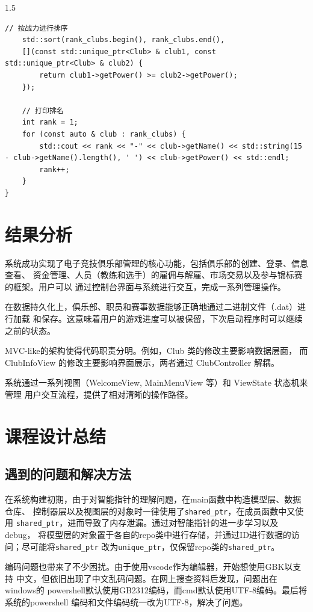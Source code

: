 \documentclass[a4paper]{article}
\begin{document}
\begin{spacing}{1.5}
\begin{lstlisting}[caption=排名]
    // 按战力进行排序
    std::sort(rank_clubs.begin(), rank_clubs.end(),
    [](const std::unique_ptr<Club> & club1, const std::unique_ptr<Club> & club2) {
        return club1->getPower() >= club2->getPower();
    });

    // 打印排名
    int rank = 1;
    for (const auto & club : rank_clubs) {
        std::cout << rank << "-" << club->getName() << std::string(15 - club->getName().length(), ' ') << club->getPower() << std::endl;
        rank++;
    }
}
    \end{lstlisting}

    \section{结果分析}
    系统成功实现了电子竞技俱乐部管理的核心功能，包括俱乐部的创建、登录、信息查看、
    资金管理、人员（教练和选手）的雇佣与解雇、市场交易以及参与锦标赛的框架。用户可以
    通过控制台界面与系统进行交互，完成一系列管理操作。

    在数据持久化上，俱乐部、职员和赛事数据能够正确地通过二进制文件（.dat）进行加载
    和保存。这意味着用户的游戏进度可以被保留，下次启动程序时可以继续之前的状态。

    MVC-like的架构使得代码职责分明。例如，Club 类的修改主要影响数据层面，
    而 ClubInfoView 的修改主要影响界面展示，两者通过 ClubController 解耦。

    系统通过一系列视图（WelcomeView, MainMenuView 等）和 ViewState 状态机来管理
    用户交互流程，提供了相对清晰的操作路径。

    \section{课程设计总结}

    \subsection{遇到的问题和解决方法}
    在系统构建初期，由于对智能指针的理解问题，在main函数中构造模型层、数据仓库、
    控制器层以及视图层的对象时一律使用了\verb|shared_ptr|，在成员函数中又使用
    \verb|shared_ptr|，进而导致了内存泄漏。通过对智能指针的进一步学习以及debug，
    将模型层的对象置于各自的repo类中进行存储，并通过ID进行数据的访问；尽可能将\verb|shared_ptr|
    改为\verb|unique_ptr|，仅保留repo类的\verb|shared_ptr|。

    编码问题也带来了不少困扰。由于使用vscode作为编辑器，开始想使用GBK以支持
    中文，但依旧出现了中文乱码问题。在网上搜查资料后发现，问题出在windows的
    powershell默认使用GB2312编码，而cmd默认使用UTF-8编码。最后将系统的powershell
    编码和文件编码统一改为UTF-8，解决了问题。


\end{spacing}
\end{document}
